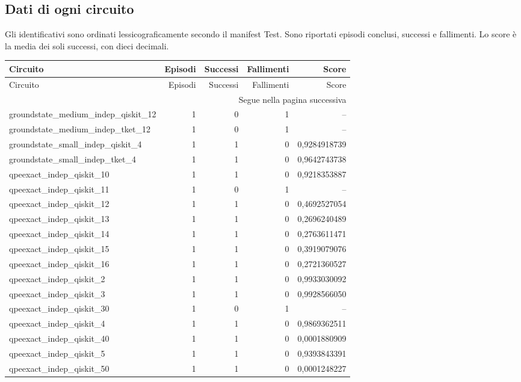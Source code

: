 \subsection{Dati di ogni circuito}
Gli identificativi sono ordinati lessicograficamente secondo il manifest Test. Sono riportati episodi conclusi, successi e fallimenti. Lo score è la media dei soli successi, con dieci decimali.
\begingroup\scriptsize
\setlength{\tabcolsep}{5pt}
\begin{longtable}{lrrrr}
\toprule
Circuito & Episodi & Successi & Fallimenti & Score \\
\midrule
\endfirsthead
\toprule
Circuito & Episodi & Successi & Fallimenti & Score \\
\midrule\endhead
\midrule\multicolumn{5}{r}{\footnotesize Segue nella pagina successiva}\\
\endfoot
\bottomrule\endlastfoot
groundstate\_medium\_indep\_qiskit\_12 & 1 & 0 & 1 & -- \\
groundstate\_medium\_indep\_tket\_12 & 1 & 0 & 1 & -- \\
groundstate\_small\_indep\_qiskit\_4 & 1 & 1 & 0 & 0,9284918739 \\
groundstate\_small\_indep\_tket\_4 & 1 & 1 & 0 & 0,9642743738 \\
qpeexact\_indep\_qiskit\_10 & 1 & 1 & 0 & 0,9218353887 \\
qpeexact\_indep\_qiskit\_11 & 1 & 0 & 1 & -- \\
qpeexact\_indep\_qiskit\_12 & 1 & 1 & 0 & 0,4692527054 \\
qpeexact\_indep\_qiskit\_13 & 1 & 1 & 0 & 0,2696240489 \\
qpeexact\_indep\_qiskit\_14 & 1 & 1 & 0 & 0,2763611471 \\
qpeexact\_indep\_qiskit\_15 & 1 & 1 & 0 & 0,3919079076 \\
qpeexact\_indep\_qiskit\_16 & 1 & 1 & 0 & 0,2721360527 \\
qpeexact\_indep\_qiskit\_2 & 1 & 1 & 0 & 0,9933030092 \\
qpeexact\_indep\_qiskit\_3 & 1 & 1 & 0 & 0,9928566050 \\
qpeexact\_indep\_qiskit\_30 & 1 & 0 & 1 & -- \\
qpeexact\_indep\_qiskit\_4 & 1 & 1 & 0 & 0,9869362511 \\
qpeexact\_indep\_qiskit\_40 & 1 & 1 & 0 & 0,0001880909 \\
qpeexact\_indep\_qiskit\_5 & 1 & 1 & 0 & 0,9393843391 \\
qpeexact\_indep\_qiskit\_50 & 1 & 1 & 0 & 0,0001248227 \\

\end{longtable}
